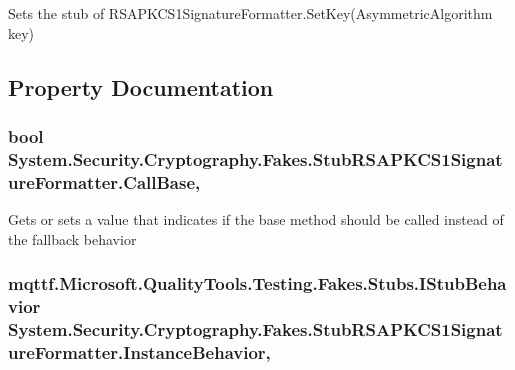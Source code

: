 Sets the stub of R\-S\-A\-P\-K\-C\-S1\-Signature\-Formatter.\-Set\-Key(\-Asymmetric\-Algorithm key)



\subsection{Property Documentation}
\hypertarget{class_system_1_1_security_1_1_cryptography_1_1_fakes_1_1_stub_r_s_a_p_k_c_s1_signature_formatter_aab7167601b0cad1e73d4c8126dfe27d6}{
\subsubsection[{Call\-Base}]{\setlength{\rightskip}{0pt plus 5cm}bool System.\-Security.\-Cryptography.\-Fakes.\-Stub\-R\-S\-A\-P\-K\-C\-S1\-Signature\-Formatter.\-Call\-Base\hspace{0.3cm}{\ttfamily [get]}, {\ttfamily [set]}}}\label{class_system_1_1_security_1_1_cryptography_1_1_fakes_1_1_stub_r_s_a_p_k_c_s1_signature_formatter_aab7167601b0cad1e73d4c8126dfe27d6}


Gets or sets a value that indicates if the base method should be called instead of the fallback behavior

\hypertarget{class_system_1_1_security_1_1_cryptography_1_1_fakes_1_1_stub_r_s_a_p_k_c_s1_signature_formatter_adb0a7b1f9f6035f35967d0c2746918b1}{
\subsubsection[{Instance\-Behavior}]{\setlength{\rightskip}{0pt plus 5cm}mqttf.\-Microsoft.\-Quality\-Tools.\-Testing.\-Fakes.\-Stubs.\-I\-Stub\-Behavior System.\-Security.\-Cryptography.\-Fakes.\-Stub\-R\-S\-A\-P\-K\-C\-S1\-Signature\-Formatter.\-Instance\-Behavior\hspace{0.3cm}{\ttfamily [get]}, {\ttfamily [set]}}}\label{class_system_1_1_security_1_1_cryptography_1_1_fakes_1_1_stub_r_s_a_p_k_c_s1_signature_formatter_adb0a7b1f9f6035f35967d0c2746918b1}


